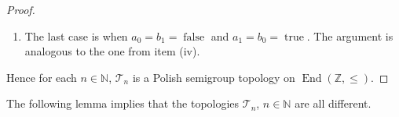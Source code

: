 \documentclass[11pt]{amsart}
\theoremstyle{definition}
\newcommand{\N}{\mathbb N}
\newcommand{\Tau}{\mathcal T}
\newcommand{\Zendd}{\operatorname{End}(\mathbb Z, \leq)}
\begin{document}
\begin{proof}
\begin{enumerate}[\rm(i)]
       Let \(W_a\) be the set of maps which are unbounded below, agree with \(a\) on the interval from \(-k\) to \(k\) and which have \(x\) as their largest image value.
       Let \(W_b\) be the set of maps which are unbounded above, agree with \(b\) on the interval from \((-k)a\) to \(x\) and have \(y\) as their smallest image value. It follows that \((W_a\times W_b)\circ\subseteq \{ab\}\) as required (we have now covered 15 cases).
     \item The last case is when  \(a_0=b_1=\operatorname{false}\) and \(a_1=b_0=\operatorname{true}\). The argument is analogous to the one from item (iv).
 \end{enumerate}
 Hence for each $n\in\N$, \(\Tau_n\) is a Polish semigroup topology on $\Zendd$.
\end{proof}


The following lemma implies that the topologies $\Tau_n$, $n\in\N$ are all different.
\end{document}

